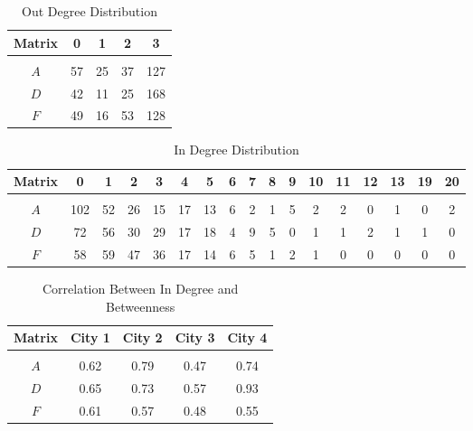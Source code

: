 \documentclass[11pt]{article}
\begin{document}
\begin{table}[ht]
\caption{Out Degree Distribution} %
\centering 
\begin{tabular}{c c c c c} %
\\[-1.8ex] \hline \hline  %
Matrix & 0 & 1 & 2 & 3\\ %
\hline \\[-1.8ex]  %
$A$ & 57  &25 & 37& 127  \\ %
$D$ & 42 & 11 & 25 &168 \\
$F$ &  49  & 16 &  53 & 128  \\  %
\hline %
\end{tabular}
\end{table}

\begin{table}[ht]
\caption{In Degree Distribution}
\centering
\begin{tabular}{ccccccccccccccccc}
\\[-1.8ex] \hline\hline
Matrix & 0 &1&2&3&4&5&6&7&8&9&10&11&12&13&19&20\\
\hline \\[-1.8ex] 
$A$ &102 &52 &26 &15 &17  &13  & 6 &  2 &  1 &  5&  2 & 2& 0 &  1 &  0& 2 \\
$D$ &72 &56 &30 &29 &17 &18  &4  &9 & 5 &0& 1 & 1&  2&  1&  1 &0\\
$F$ &58 &59 &47 &36 &17 &14 & 6 & 5 & 1 & 2 & 1&0&0&0&0&0 \\
\hline
\end{tabular}
\end{table}


\begin{table}[ht]
\caption{Correlation Between In Degree and Betweenness}
\centering
\begin{tabular}{ccccc}
\\[-1.8ex] \hline\hline
Matrix & City 1 & City 2 & City 3 & City 4\\
\hline \\[-1.8ex] 
$A$ & 0.62 & 0.79 & 0.47 & 0.74\\
$D$ & 0.65 & 0.73 & 0.57 & 0.93\\
$F$ & 0.61 & 0.57 & 0.48 & 0.55\\
\hline
\end{tabular}
\end{table}
\end{document}
